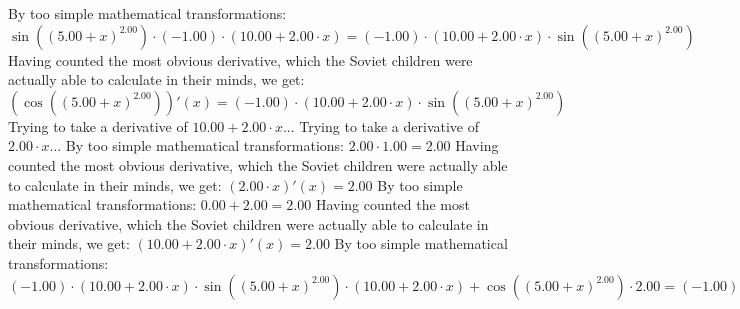 \documentclass{article}
\begin{document}
By too simple mathematical transformations:
 ${{ \sin {\left({\left({{5.00} + {x}}\right) ^ {2.00}}\right)}  \cdot \left({-1.00}\right)} \cdot \left({{10.00} + {{2.00} \cdot {x}}}\right)} = {\left({-1.00}\right) \cdot {\left({{10.00} + {{2.00} \cdot {x}}}\right) \cdot  \sin {\left({\left({{5.00} + {x}}\right) ^ {2.00}}\right)} }}$ 
 \newline
 \newline 
Having counted the most obvious derivative, which the Soviet children were actually able to calculate in their minds, we get:
$( \cos {\left({\left({{5.00} + {x}}\right) ^ {2.00}}\right)} )'(x) = {\left({-1.00}\right) \cdot {\left({{10.00} + {{2.00} \cdot {x}}}\right) \cdot  \sin {\left({\left({{5.00} + {x}}\right) ^ {2.00}}\right)} }}$\newline
\newline
Trying to take a derivative of ${{10.00} + {{2.00} \cdot {x}}}$...\newline
\newline
Trying to take a derivative of ${{2.00} \cdot {x}}$...\newline
\newline
By too simple mathematical transformations:
 ${{2.00} \cdot {1.00}} = {2.00}$ 
 \newline
 \newline 
Having counted the most obvious derivative, which the Soviet children were actually able to calculate in their minds, we get:
$({{2.00} \cdot {x}})'(x) = {2.00}$\newline
\newline
By too simple mathematical transformations:
 ${{0.00} + {2.00}} = {2.00}$ 
 \newline
 \newline 
Having counted the most obvious derivative, which the Soviet children were actually able to calculate in their minds, we get:
$({{10.00} + {{2.00} \cdot {x}}})'(x) = {2.00}$\newline
\newline
By too simple mathematical transformations:
 ${{{\left({-1.00}\right) \cdot {\left({{10.00} + {{2.00} \cdot {x}}}\right) \cdot  \sin {\left({\left({{5.00} + {x}}\right) ^ {2.00}}\right)} }} \cdot \left({{10.00} + {{2.00} \cdot {x}}}\right)} + { \cos {\left({\left({{5.00} + {x}}\right) ^ {2.00}}\right)}  \cdot {2.00}}} = {{\left({-1.00}\right) \cdot {\left({{10.00} + {{2.00} \cdot {x}}}\right) \cdot {\left({{10.00} + {{2.00} \cdot {x}}}\right) \cdot  \sin {\left({\left({{5.00} + {x}}\right) ^ {2.00}}\right)} }}} + {{2.00} \cdot  \cos {\left({\left({{5.00} + {x}}\right) ^ {2.00}}\right)} }}$ 
\end{document}
